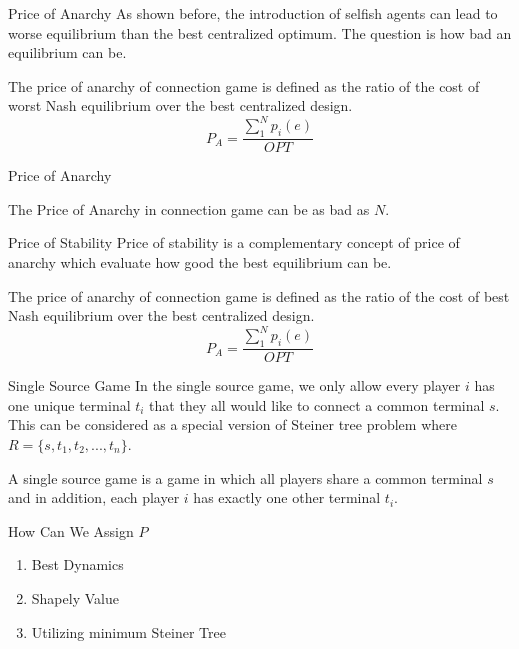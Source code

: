 \documentclass[11pt,aspectratio=169]{beamer}
\begin{document}
\begin{frame}{Price of Anarchy}
    As shown before, the introduction of selfish agents can lead to worse equilibrium than the best centralized optimum. The question is how bad an equilibrium can be.

    \begin{definition} The price of anarchy of connection game is defined as the ratio of the cost of worst Nash equilibrium over the best centralized design.
        \[P_A = \dfrac{\sum_{1}^{N}p_i(e) }{OPT}\]
    \end{definition}
   
\end{frame}

\begin{frame}{Price of Anarchy}
    \begin{lemma}
        The Price of Anarchy in connection game can be as bad as \(N\).
    \end{lemma}
\end{frame}

\begin{frame}{Price of Stability}
    Price of stability is a complementary concept of price of anarchy which evaluate how good the best equilibrium can be. 

\begin{definition} 
    The price of anarchy of connection game is defined as the ratio of the cost of best Nash equilibrium over the best centralized design.
    \[P_A = \dfrac{\sum_{1}^{N}p_i(e) }{OPT}\]
    \end{definition}
\end{frame}

\begin{frame}{Single Source Game}
    In the single source game, we only allow every player \(i\) has one unique terminal \(t_i\) that they all would like to connect a common terminal \(s\). This can be considered as a special version of Steiner tree problem where \(R = \{s,t_1,t_2,...,t_n\}\). 
\vspace{10pt}
\begin{definition}
	A single source game is a game in which all players share a common terminal \(s\) and in addition, each player \(i\) has exactly one other terminal \(t_i\).
\end{definition}
\end{frame}

\begin{frame}{How Can We Assign $P$}
    \begin{enumerate}
        \item Best Dynamics 
        \item Shapely Value 
        \item Utilizing minimum Steiner Tree
    \end{enumerate}
\end{frame}
\end{document}

